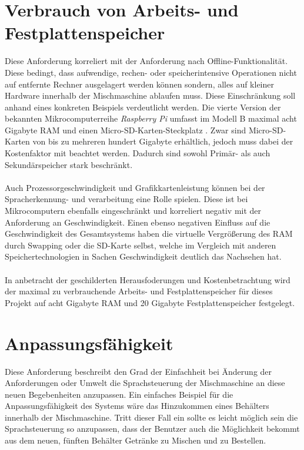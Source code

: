 \section{Verbrauch von Arbeits- und Festplattenspeicher}
Diese Anforderung korreliert mit der Anforderung nach Offline-Funktionalität. Diese bedingt, dass aufwendige, rechen- oder speicherintensive Operationen nicht auf entfernte Rechner ausgelagert werden können sondern, alles auf \glqq{}kleiner\grqq{} Hardware innerhalb der Mischmaschine ablaufen muss. Diese Einschränkung soll anhand eines konkreten Beispiels verdeutlicht werden. Die vierte Version der bekannten Mikrocomputerreihe \textit{Raspberry Pi} umfasst im Modell B maximal acht Gigabyte \ac{RAM} und einen Micro-SD-Karten-Steckplatz \cite{ltd_raspberry_nodate}. Zwar sind Micro-SD-Karten von bis zu mehreren hundert Gigabyte erhältlich, jedoch muss dabei der Kostenfaktor mit beachtet werden. Dadurch sind sowohl Primär- als auch Sekundärspeicher stark beschränkt.\\\\
Auch Prozessorgeschwindigkeit und Grafikkartenleistung können bei der Spracherkennung- und verarbeitung eine Rolle spielen. Diese ist bei Mikrocomputern ebenfalls eingeschränkt und korreliert negativ mit der Anforderung an Geschwindigkeit. Einen ebenso negativen Einfluss auf die Geschwindigkeit des Gesamtsystems haben die virtuelle Vergrößerung des \ac{RAM} durch Swapping oder die SD-Karte selbst, welche im Vergleich mit anderen Speichertechnologien in Sachen Geschwindigkeit deutlich das Nachsehen hat.\\\\
In anbetracht der geschilderten Herausfoderungen und Kostenbetrachtung wird der maximal zu verbrauchende Arbeits- und Festplattenspeicher für dieses Projekt auf acht Gigabyte \ac{RAM} und 20 Gigabyte Festplattenspeicher festgelegt.
\section{Anpassungsfähigkeit}
Diese Anforderung beschreibt den Grad der Einfachheit bei Änderung der Anforderungen oder Umwelt die Sprachsteuerung der Mischmaschine an diese neuen Begebenheiten anzupassen. Ein einfaches Beispiel für die Anpassungsfähigkeit des Systems wäre das Hinzukommen eines Behälters innerhalb der Mischmaschine. Tritt dieser Fall ein sollte es leicht möglich sein die Sprachsteuerung so anzupassen, dass der Benutzer auch die Möglichkeit bekommt aus dem neuen, fünften Behälter Getränke zu Mischen und zu Bestellen. 
